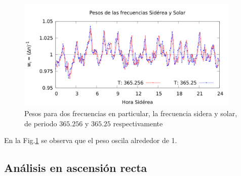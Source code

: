 	\begin{figure}[H]
		\centering
		\includegraphics[width=0.95\textwidth]{pesos_solar_siderea.png}
		\caption{Pesos para dos frecuencias en particular, la frecuencia sidera y solar, de periodo $365.256$ y $365.25$ respectivamente}
		\label{fig:pesos_ejem}
	\end{figure}

	En la Fig.\ref{fig:pesos_ejem} se observa que el peso oscila alrededor de 1.

	\subsection{Análisis en ascensión recta}
	

